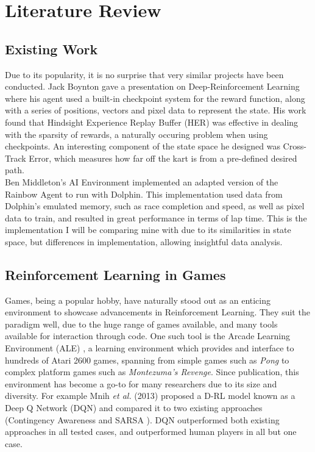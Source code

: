 \chapter{Literature Review}
\section{Existing Work}
Due to its popularity, it is no surprise that very similar projects have been conducted. Jack Boynton gave a presentation on Deep-Reinforcement Learning \cite{JackWBoynton} where his agent used a built-in checkpoint system for the reward function, along with a series of positions, vectors and pixel data to represent the state. His work found that Hindsight Experience Replay Buffer (HER) \cite{andrychowicz2017hindsight} was effective in dealing with the sparsity of rewards, a naturally occuring problem when using checkpoints. An interesting component of the state space he designed was Cross-Track Error, which measures how far off the kart is from a pre-defined desired path. \\Ben Middleton's AI Environment \cite{BenJMiddleton} implemented an adapted version of the Rainbow Agent \cite{RainbowAgent} \cite{hessel2018rainbow} to run with Dolphin. This implementation used data from Dolphin's emulated memory, such as race completion and speed, as well as pixel data to train, and resulted in great performance in terms of lap time. This is the implementation I will be comparing mine with due to its similarities in state space, but differences in implementation, allowing insightful data analysis. 
\section{Reinforcement Learning in Games}
Games, being a popular hobby, have naturally stood out as an enticing environment to showcase advancements in Reinforcement Learning. They suit the paradigm well, due to the huge range of games available, and many tools available for interaction through code. One such tool is the Arcade Learning Environment (ALE) \cite{bellemare2013arcade}, a learning environment which provides and interface to hundreds of Atari 2600 games, spanning from simple games such as \textit{Pong} to complex platform games such as \textit{Montezuma's Revenge}. Since publication, this environment has become a go-to for many researchers due to its size and diversity. For example Mnih \textit{et al.} (2013) \cite{mnih2013playing} proposed a D-RL model known as a Deep Q Network (DQN) and compared it to two existing approaches (Contingency Awareness \cite{bellemare2012investigating} and SARSA \cite{rummery1994line}). DQN outperformed both existing approaches in all tested cases, and outperformed human players in all but one case. 
